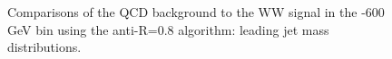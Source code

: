 \begin{figure}
\begin{center}
\caption{Comparisons of the QCD background to the WW signal in the -600 GeV bin using the anti-\kT R=0.8 algorithm: leading
  jet mass distributions.}
\label{fig:pt500_mass_AKt_R08}
\end{center}
\end{figure}

